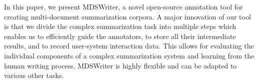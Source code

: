 In this paper, we present MDSWriter, a novel open-source annotation tool for creating multi-document summarization corpora. A major innovation of our tool is that we divide the complex summarization task into multiple steps which enables us to efficiently guide the annotators, to store all their intermediate results, and to record user-system interaction data. This allows for evaluating the individual components of a complex summarization system and learning from the human writing process. MDSWriter is highly flexible and can be adapted to various other tasks.
